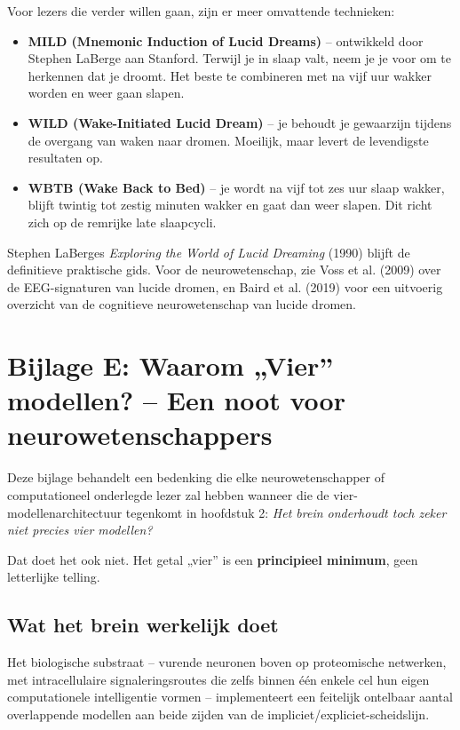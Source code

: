 \documentclass[11pt, twoside, openright]{book}
\begin{document}
Voor lezers die verder willen gaan, zijn er meer omvattende technieken:

\begin{itemize}
  \item \textbf{MILD (Mnemonic Induction of Lucid Dreams)} -- ontwikkeld door Stephen LaBerge aan Stanford. Terwijl je in slaap valt, neem je je voor om te herkennen dat je droomt. Het beste te combineren met na vijf uur wakker worden en weer gaan slapen.
  \item \textbf{WILD (Wake-Initiated Lucid Dream)} -- je behoudt je gewaarzijn tijdens de overgang van waken naar dromen. Moeilijk, maar levert de levendigste resultaten op.
  \item \textbf{WBTB (Wake Back to Bed)} -- je wordt na vijf tot zes uur slaap wakker, blijft twintig tot zestig minuten wakker en gaat dan weer slapen. Dit richt zich op de remrijke late slaapcycli.
\end{itemize}

Stephen LaBerges \textit{Exploring the World of Lucid Dreaming} (1990) blijft de definitieve praktische gids. Voor de neurowetenschap, zie Voss et al. (2009) over de EEG-signaturen van lucide dromen, en Baird et al. (2019) voor een uitvoerig overzicht van de cognitieve neurowetenschap van lucide dromen.


\chapter*{Bijlage E: Waarom „Vier” modellen? -- Een noot voor neurowetenschappers}

Deze bijlage behandelt een bedenking die elke neurowetenschapper of computationeel onderlegde lezer zal hebben wanneer die de vier-modellenarchitectuur tegenkomt in hoofdstuk 2: \textit{Het brein onderhoudt toch zeker niet precies vier modellen?}

Dat doet het ook niet. Het getal „vier” is een \textbf{principieel minimum}, geen letterlijke telling.

\section*{Wat het brein werkelijk doet}

Het biologische substraat -- vurende neuronen boven op proteomische netwerken, met intracellulaire signaleringsroutes die zelfs binnen één enkele cel hun eigen computationele intelligentie vormen -- implementeert een feitelijk ontelbaar aantal overlappende modellen aan beide zijden van de impliciet/\allowbreak{}expliciet-scheidslijn.
\end{document}

